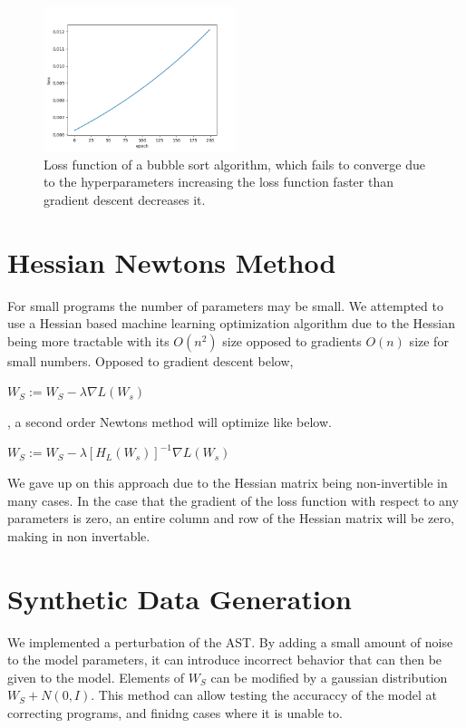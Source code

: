 \documentclass{article}
\begin{document}
\begin{figure}[h!]
  \begin{center}
    \includegraphics[width=0.5\textwidth]{bubble_sort.png}
  \end{center}
  \caption{Loss function of a bubble sort algorithm, which fails to converge due to the hyperparameters increasing the loss function faster than gradient descent decreases it.}
  \label{fig:bubble_sort}
\end{figure}
\section{Hessian Newtons Method}
For small programs the number of parameters may be small. We attempted to use a Hessian based machine learning optimization algorithm due to the Hessian being more tractable with its $O(n^2)$ size opposed to gradients $O(n)$ size for small numbers. Opposed to gradient descent below,

\begin{center}
  $W_S := W_S - \lambda \nabla L(W_s)$
\end{center}

, a second order Newtons method will optimize like below.
\begin{center}
  $W_S := W_S - \lambda [H_L(W_s)]^{-1} \nabla L(W_s)$
\end{center}

We gave up on this approach due to the Hessian matrix being non-invertible in many cases. In the case that the gradient of the loss function with respect to any parameters is zero, an entire column and row of the Hessian matrix will be zero, making in non invertable.

\section{Synthetic Data Generation}
We implemented a perturbation of the AST. By adding a small amount of noise to the model parameters, it can introduce incorrect behavior that can then be given to the model. Elements of $W_S$ can be modified by a gaussian distribution $W_S + N(0, I)$. This method can allow testing the accuraccy of the model at correcting programs, and finidng cases where it is unable to.
\end{document}
